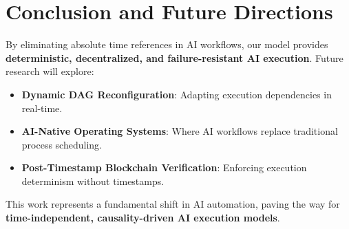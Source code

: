 \documentclass{article}
\begin{document}
\section{Conclusion and Future Directions}
By eliminating absolute time references in AI workflows, our model provides \textbf{deterministic, decentralized, and failure-resistant AI execution}. Future research will explore:
\begin{itemize}
    \item \textbf{Dynamic DAG Reconfiguration}: Adapting execution dependencies in real-time.
    \item \textbf{AI-Native Operating Systems}: Where AI workflows replace traditional process scheduling.
    \item \textbf{Post-Timestamp Blockchain Verification}: Enforcing execution determinism without timestamps\cite{Harel1987}.
\end{itemize}

This work represents a fundamental shift in AI automation, paving the way for \textbf{time-independent, causality-driven AI execution models}.



\end{document}
